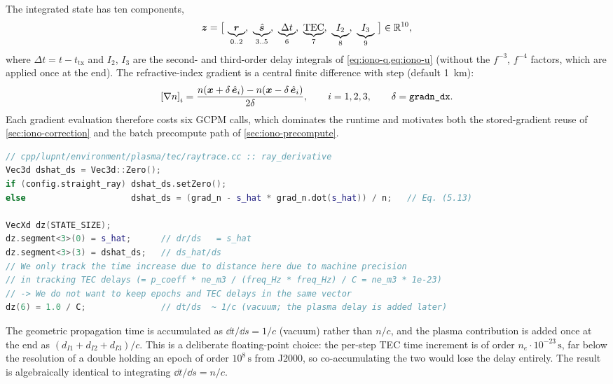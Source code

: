 The integrated state has ten components,
%
\begin{equation}
  \label{eq:iono-statevec}
  \vec{z} = \big[\,\underbrace{\vec{r}}_{0..2},\ \underbrace{\uvec{s}}_{3..5},\
                  \underbrace{\Delta t}_{6},\ \underbrace{\mathrm{TEC}}_{7},\
                  \underbrace{I_2}_{8},\ \underbrace{I_3}_{9}\,\big]
       \in \mathbb{R}^{10},
\end{equation}
%
where $\Delta t = t - t_\mathrm{tx}$ and $I_2$, $I_3$ are the second- and
third-order delay integrals of \cref{eq:iono-q,eq:iono-u} (without the $f^{-3}$,
$f^{-4}$ factors, which are applied once at the end).  The refractive-index
gradient is a central finite difference with step \code{config.gradn\_dx}
(default \SI{1}{\kilo\meter}):
%
\begin{equation}
  \label{eq:iono-gradn}
  \left[\nabla n\right]_i
  = \frac{n(\bm{x} + \delta\,\hat{\bm{e}}_i) - n(\bm{x} - \delta\,\hat{\bm{e}}_i)}{2\delta},
  \qquad i = 1,2,3, \qquad \delta = \texttt{gradn\_dx} .
\end{equation}
%
Each gradient evaluation therefore costs six GCPM calls, which dominates the
runtime and motivates both the stored-gradient reuse of
\cref{sec:iono-correction} and the batch precompute path of
\cref{sec:iono-precompute}.

\begin{lstlisting}[language=cpp, caption={Eikonal right-hand side.  Source:
\texttt{cpp/lupnt/environment/plasma/tec/raytrace.cc} ::
\code{ray\_derivative}.}, label={lst:iono-derivative}]
// cpp/lupnt/environment/plasma/tec/raytrace.cc :: ray_derivative
Vec3d dshat_ds = Vec3d::Zero();
if (config.straight_ray) dshat_ds.setZero();
else                     dshat_ds = (grad_n - s_hat * grad_n.dot(s_hat)) / n;   // Eq. (5.13)

VecXd dz(STATE_SIZE);
dz.segment<3>(0) = s_hat;      // dr/ds   = s_hat
dz.segment<3>(3) = dshat_ds;   // ds_hat/ds
// We only track the time increase due to distance here due to machine precision
// in tracking TEC delays (= p_coeff * ne_m3 / (freq_Hz * freq_Hz) / C = ne_m3 * 1e-23)
// -> We do not want to keep epochs and TEC delays in the same vector
dz(6) = 1.0 / C;               // dt/ds  ~ 1/c (vacuum; the plasma delay is added later)
\end{lstlisting}

\begin{lupntnote}
The geometric propagation time is accumulated as $\dd t/\dd s = 1/c$ (vacuum)
rather than $n/c$, and the plasma contribution is added once at the end as
$(d_{I1} + d_{I2} + d_{I3})/c$.  This is a deliberate floating-point choice: the
per-step TEC time increment is of order $n_e \cdot 10^{-23}\,\si{\second}$, far
below the resolution of a double holding an epoch of order $10^{8}\,\si{\second}$
from J2000, so co-accumulating the two would lose the delay entirely.  The result
is algebraically identical to integrating $\dd t/\dd s = n/c$.
\end{lupntnote}

